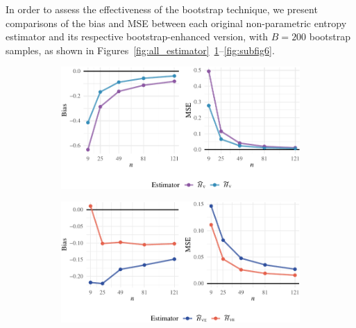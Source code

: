 In order to assess the effectiveness of the bootstrap technique, we present comparisons of the bias and MSE between each original non-parametric entropy estimator and its respective bootstrap-enhanced version, with \(B=200\) bootstrap samples, as shown in Figures~\ref{fig:all_estimator}~\ref{fig:Firstfigure}--\ref{fig:subfig6}.
\begin{figure}[H]
  \centering
  \begin{subfigure}[t]{0.48\textwidth}
    \centering
    \includegraphics[width=\textwidth]{../../Figures/PDF/Plot_bias_mse_vasicek-1}
    \caption{}
    \label{fig:Firstfigure}
  \end{subfigure}
  \hfill
  \begin{subfigure}[t]{0.48\textwidth}
    \centering
    \includegraphics[width=\textwidth]{../../Figures/PDF/Plot_bias_mse_VanEs-1}
    \caption{}
    \label{fig:Secondfigure}
  \end{subfigure}
	

\end{figure}
